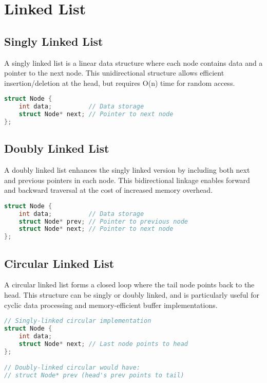 \section{Linked List}

\subsection{Singly Linked List}
A singly linked list is a linear data structure where each node contains data and a pointer to the next node. This unidirectional structure allows efficient insertion/deletion at the head, but requires O(n) time for random access.

\begin{lstlisting}[language=C, caption=Singly Linked List Node Structure]
struct Node {
    int data;          // Data storage
    struct Node* next; // Pointer to next node
};
\end{lstlisting}

\subsection{Doubly Linked List}
A doubly linked list enhances the singly linked version by including both next and previous pointers in each node. This bidirectional linkage enables forward and backward traversal at the cost of increased memory overhead.

\begin{lstlisting}[language=C, caption=Doubly Linked List Node Structure]
struct Node {
    int data;          // Data storage
    struct Node* prev; // Pointer to previous node
    struct Node* next; // Pointer to next node
};
\end{lstlisting}

\subsection{Circular Linked List}
A circular linked list forms a closed loop where the tail node points back to the head. This structure can be singly or doubly linked, and is particularly useful for cyclic data processing and memory-efficient buffer implementations.

\begin{lstlisting}[language=C, caption=Circular Linked List Node Structure]
// Singly-linked circular implementation
struct Node {
    int data;
    struct Node* next; // Last node points to head
};

// Doubly-linked circular would have:
// struct Node* prev (head's prev points to tail)
\end{lstlisting}